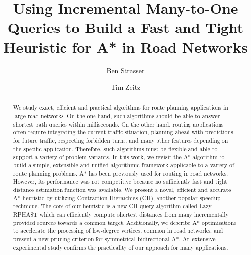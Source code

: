 \documentclass[manuscript,review]{acmart}
\begin{document}
\title{Using Incremental Many-to-One Queries to Build a Fast and Tight Heuristic for A* in Road Networks}

\author{Ben Strasser}

\author{Tim Zeitz}


\renewcommand{\shortauthors}{B. Strasser and T. Zeitz}


\begin{abstract}
We study exact, efficient and practical algorithms for route planning applications in large road networks.
On the one hand, such algorithms should be able to answer shortest path queries within milliseconds.
On the other hand, routing applications often require integrating the current traffic situation, planning ahead with predictions for future traffic, respecting forbidden turns, and many other features depending on the specific application.
Therefore, such algorithms must be flexible and able to support a variety of problem variants.
In this work, we revisit the A* algorithm to build a simple, extensible and unified algorithmic framework applicable to a variety of route planning problems. %
A* has been previously used for routing in road networks.
However, its performance was not competitive because no sufficiently fast and tight distance estimation function was available.
We present a novel, efficient and accurate A* heuristic by utilizing Contraction Hierarchies (CH), another popular speedup technique.
The core of our heuristic is a new CH query algorithm called Lazy RPHAST which can efficiently compute shortest distances from many incrementally provided sources towards a common target.
Additionally, we describe A* optimizations to accelerate the processing of low-degree vertices, common in road networks, and present a new pruning criterion for symmetrical bidirectional A*.
An extensive experimental study confirms the practicality of our approach for many applications.
\end{abstract}
\end{document}
